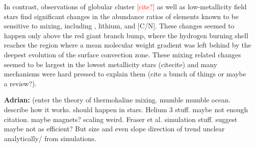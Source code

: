 In contrast, observations of globular cluster \textcolor{red}{[cite?]} as well as low-metallicity field stars \citep{Gratton2000} find significant changes in the abundance ratios of elements known to be sensitive to mixing, including \ctwelvecthirteen, lithium, and [C/N]. 
These changes seemed to happen only above the red giant branch bump, where the hydrogen burning shell reaches the region where a mean molecular weight gradient was left behind by the deepest evolution of the surface convection zone. These mixing related changes seemed to be largest in the lowest metallicity stars (citecite) and many mechanisms were hard pressed to explain them (cite a bunch of things or maybe a review?). 

\textbf{Adrian:} (enter the theory of thermohaline mixing. mumble mumble ocean. describe how it works. should happen in stars. Helium 3 stuff. maybe not enough citation. maybe magnets? scaling weird. Fraser et al. simulation stuff.  suggest maybe not as efficient? But size and even slope direction of trend unclear analytically/ from simulations. 

